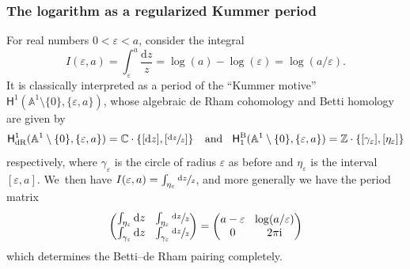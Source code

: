 \documentclass[JEP,XML,SOM,Unicode,NoFloatCountersInSection,published]{cedram}
\let\oldbullet\bullet
\renewcommand{\bullet}{{\raisebox{1pt}{$\scriptscriptstyle\oldbullet$}}}
\newcommand{\dslog}[1]{\sfrac{\dd#1}{#1}}
\theoremstyle{definition}
\theoremstyle{remark}
\newcommand{\CC}{\mathbb{C}}
\newcommand{\ZZ}{\mathbb{Z}}
\newcommand{\AF}{\mathbb{A}}
\newcommand{\iu}{\mathrm{i}}
\newcommand{\ipi}{\pi\iu }
\newcommand{\tipi}{2\ipi}
\let\epsilon\varepsilon
\newcommand{\rbrac}[1]{\left(#1\right)}
\newcommand{\sbrac}[1]{\left[#1\right]}
\newcommand{\cbrac}[1]{\left\{#1\right\}}
\newcommand{\dd}{\mathrm{d}}
\newcommand{\dlog}[1]{\frac{\dd#1}{#1}}
\newcommand{\coH}[2][\bullet]{\mathsf{H}^{#1}\rbrac{#2}}
\newcommand{\HdR}[2][\bullet]{\mathsf{H}_{\mathrm{dR}}^{#1}(#2)}
\newcommand{\HlgyB}[2][\bullet]{\mathsf{H}^{\mathrm{B}}_{#1}(#2)}
\begin{document}
\subsubsection{The logarithm as a regularized Kummer period}\label{sec:kummers}
For real numbers $0 < \epsilon < a$, consider the integral
\[
I(\epsilon,a) = \int_\epsilon^a \dlog{z} = \log(a) - \log(\epsilon) = \log(a/\epsilon).
\]
It is classically interpreted as a period of the ``Kummer motive'' $\coH[1]{\AF^1\setminus \{0\},\{\epsilon,a\}}$, whose algebraic de Rham cohomology and Betti homology are given by
\[
\HdR[1]{\AF^1\setminus\{0\},\{\epsilon,a\}} = \CC \cdot \cbrac{[\dd z],\sbrac{\dslog{z}}} \;\; \mbox{ and } \;\;
\HlgyB[1]{\AF^1\setminus\{0\},\{\epsilon,a\}} = \ZZ \cdot \{ [\gamma_\epsilon], [\eta_\epsilon] \}
\]
respectively, where $\gamma_\epsilon$ is the circle of radius $\epsilon$ as before and $\eta_\epsilon$ is the interval $[\epsilon,a]$. We~then have $I(\epsilon,a) = \int_{\eta_\epsilon}\dslog{z}$, and more generally we have the period matrix
\[\arraycolsep4.5pt
\begin{pmatrix}
\int_{\eta_\epsilon} \dd z & \int_{\eta_\epsilon} \dslog{z} \\
\int_{\gamma_\epsilon} \dd z & \int_{\gamma_\epsilon} \dslog{z}
\end{pmatrix} = \begin{pmatrix}
a-\epsilon & \log(a/\epsilon)\\
0 & \tipi
\end{pmatrix}
\]
which determines the Betti--de Rham pairing completely.
\end{document}
